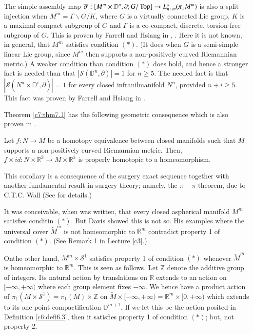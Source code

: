 \begin{remark}\label{c8:rem2} %
  The simple assembly map $\overline{\sigma} : [M^m \times \mathbb{D}^n,
    \partial ; G/\operatorname{Top}]\to L_{n+m}^s(\pi_1 M^m)$ is also a split
  injection when $M^m= \Gamma \backslash G/K$, where $G$ is a
  virtually connected Lie group, $K$ is a maximal compact subgroup of
  $G$ and $\Gamma$ is a co-compact, discrete, torsion-free subgroup of
  $G$. This is proven by Farrell and Hsiang in \cite{33},
  \cite{34}. Here it is not known, in general, that $M^m$ satisfies
  condition $(*)$. (It does when $G$ is a semi-simple linear Lie
  group, since $M^m$ then supports a non-positively curved Riemannian
  metric.) A weaker condition than condition $(*)$ does hold, and
  hence a stronger fact is needed than that
  $|\mathcal{S}(\mathbb{D}^n, \partial)|=1$ for $n \geq 5$. The needed
  fact is that $|\mathcal{S} (N^n \times \mathbb{D}^i, \partial)|=1$
  for every closed infranilmanifold $N^n$, provided $n + i\geq
  5$. This fact was proven by Farrell and Hsiang in \cite{32}. 
\end{remark}

Theorem \ref{c7:thm7.1} has the following geometric consequence which
is also proven in \cite{30}.

\begin{coro}\label{c8:coro8.2}
  Let $f: N \to M$ be a homotopy equivalence between closed manifolds
  such that $M$ supports a non-positively curved Riemannian
  metric. Then, $f \times id: N \times \mathbb{R}^3 \to  M \times
  \mathbb{R}^3$ is properly homotopic to a homeomorphism.
\end{coro}

This corollary is a consequence of the surgery exact sequence together
with another fundamental result in surgery theory; namely, the $\pi -
\pi$ theorem, due to C.T.C. Wall (See \cite{30} for details.)

\begin{remark}\label{c8:rem3}%
  It was conceivable, when \cite{30} was written, that every closed
  aspherical manifold $M^m$ satisfies conditin $(*)$. But Davis
  \cite{21} showed this is not so. His examples where the universal
  cover $\tilde{M}^m$ is not homeomorphic to $\mathbb{R}^m$ contradict
  property 1 of condition $(*)$. (See Remark 1 in Lecture \ref{c3}.)
\end{remark}

On\pageoriginale the other hand, $M^m \times \mathcal{S}^1$ satisfies
property 1 of 
condition $(*)$ whenever $\tilde{M}^m$ is homeomorphic to
$\mathbb{R}^m$. This is seen as follows. Let $\mathbb{Z}$ denote the
additive group of integers. Its natural action by translations on
$\mathbb{R}$ extends to an action on $[- \infty, + \infty)$ where each
  group element fixes $- \infty$. We hence have a product action of
  $\pi_1 (M \times \mathcal{S}^1)= \pi_1 (M) \times \mathbb{Z}$ on
  $\tilde{M}\times [-\infty, + \infty)= \mathbb{R}^m \times [0, +
      \infty)$ which extends to its one point compactification
      $\mathbb{D}^{m+1}$. If we let this be the action posited in
      Definition \ref{c6:defi6.3}, then it satisfies property 1 of
      condition $(*)$; but, not property 2.


